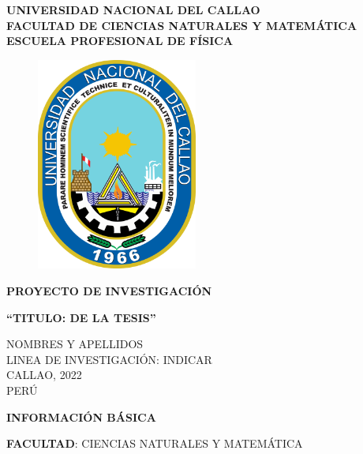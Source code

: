 \documentclass[12pt,a4paper]{article}
\begin{document}
\pagestyle{empty}
\begin{titlepage}
	\begin{center}
		{\textbf{UNIVERSIDAD NACIONAL DEL CALLAO}}\\
		{\textbf{FACULTAD DE CIENCIAS NATURALES Y MATEMÁTICA}}\\
		{\textbf{ESCUELA PROFESIONAL DE FÍSICA}}\\
		\vspace{2cm}
		\begin{figure}[h]
			\centering
			\includegraphics[height=7cm]{imagenes/logounac}
		\end{figure}
		\vspace{1cm}
		{\bf PROYECTO DE INVESTIGACIÓN}\\
		\vspace{2mm}
		\begin{center}
			{\textbf{``TITULO: DE LA TESIS''}}
		\end{center}

		\vspace{15mm}
		{NOMBRES Y APELLIDOS}\\
		\vspace{4mm}
		{LINEA DE INVESTIGACIÓN: INDICAR}\\

	\vspace{16mm}
	{CALLAO, 2022}\\
	\vspace{2mm}
	{PERÚ}
	\end{center}
\end{titlepage}

\newpage
\begin{center}
\bf \large INFORMACIÓN BÁSICA
\end{center}
\textbf{FACULTAD}: CIENCIAS NATURALES Y MATEMÁTICA\\[0.4cm]
\end{document}
